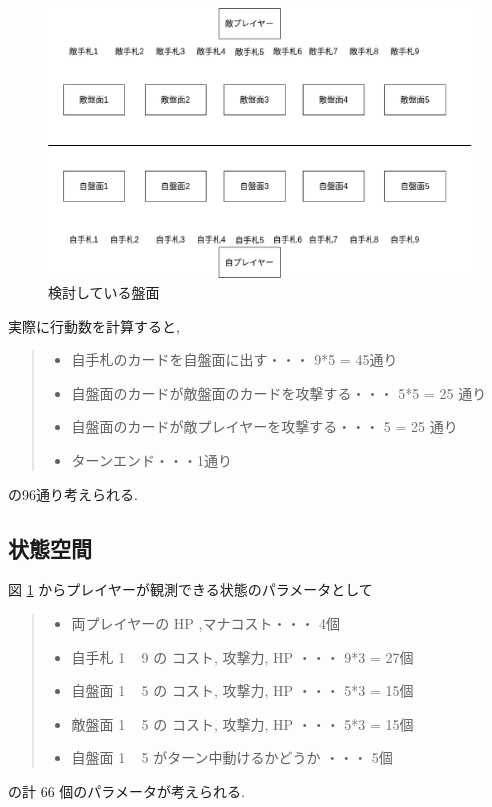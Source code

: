 \documentclass{jarticle}     %
\begin{document}
\begin{figure}[htbp]
  \centering
  \includegraphics[width=150mm]{assets/idea.eps}
  \caption{ 検討している盤面}
  \label{fig:idea}
\end{figure}
実際に行動数を計算すると,
\begin{quote}
  \begin{itemize}
   \item 自手札のカードを自盤面に出す・・・  9*5 = 45通り
   \item 自盤面のカードが敵盤面のカードを攻撃する・・・ 5*5 = 25 通り
   \item 自盤面のカードが敵プレイヤーを攻撃する・・・ 5 = 25 通り
   \item ターンエンド・・・1通り
  \end{itemize}
 \end{quote}
の96通り考えられる.

\subsection{状態空間}
図 \ref{fig:idea} からプレイヤーが観測できる状態のパラメータとして
\begin{quote}
  \begin{itemize}
   \item 両プレイヤーの HP ,マナコスト・・・ 4個
   \item 自手札 1 ~ 9 の コスト, 攻撃力, HP ・・・ 9*3 = 27個
   \item 自盤面 1 ~ 5 の コスト, 攻撃力, HP ・・・ 5*3 = 15個
   \item 敵盤面 1 ~ 5 の コスト, 攻撃力, HP ・・・ 5*3 = 15個
   \item 自盤面 1 ~ 5 がターン中動けるかどうか ・・・ 5個
  \end{itemize}
 \end{quote}
の計 66 個のパラメータが考えられる.
\end{document}
